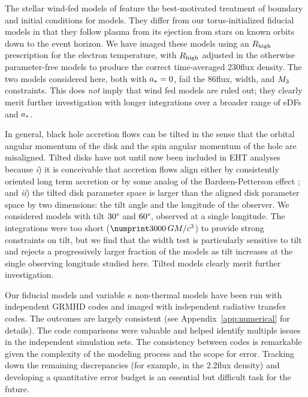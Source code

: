 The stellar wind-fed models of \citet{2020ApJ...896L...6R} feature the best-motivated treatment of boundary and initial conditions for \sgra models.
They differ from our torus-initialized fiducial models in that they follow plasma from its ejection from stars on known orbits down to the event horizon.
We have imaged these models using an $R_\mathrm{high}$ prescription for the electron temperature, with $R_\mathrm{high}$ adjusted in the otherwise parameter-free models to produce the correct time-averaged 230\GHz flux density.
The two models considered here, both with $a_* = 0$, fail the 86\GHz flux, \mring width, and $M_{3}$ constraints.
This does {\em not} imply that wind fed models are ruled out; they clearly merit further investigation with longer integrations over a broader range of eDFs and $a_*$.

In general, black hole accretion flows can be tilted in the sense that the orbital angular momentum of the disk and the spin angular momentum of the hole are misaligned.
Tilted disks have not until now been included in EHT analyses because
\emph{i}) it is conceivable that accretion flows align either by consistently oriented long term accretion or by some analog of the Bardeen-Petterson effect \citep{1975ApJ...195L..65B}; and
\emph{ii}) the tilted disk parameter space is larger than the aligned disk parameter space by two dimensions: the tilt angle and the longitude of the observer.
We considered models with tilt $30\degree$ and $60\degree$, observed at a single longitude.
The integrations were too short ($\no{3000}\,\tg$) to provide strong constraints on tilt, but we find that the \mring width test is particularly sensitive to tilt and rejects a progressively larger fraction of the models as tilt increases at the single observing longitude studied here.
Tilted models clearly merit further investigation.

Our fiducial models and variable $\kappa$ non-thermal models have been run with independent GRMHD codes and imaged with independent radiative transfer codes.
The outcomes are largely consistent (see Appendix~\ref{app:numerical} for details).
The code comparisons were valuable and helped identify multiple issues in the independent simulation sets.
The consistency between codes is remarkable given the complexity of the modeling process and the scope for error.
Tracking down the remaining discrepancies (for example, in the 2.2\um flux density) and developing a quantitative error budget is an essential but difficult task for the future.
